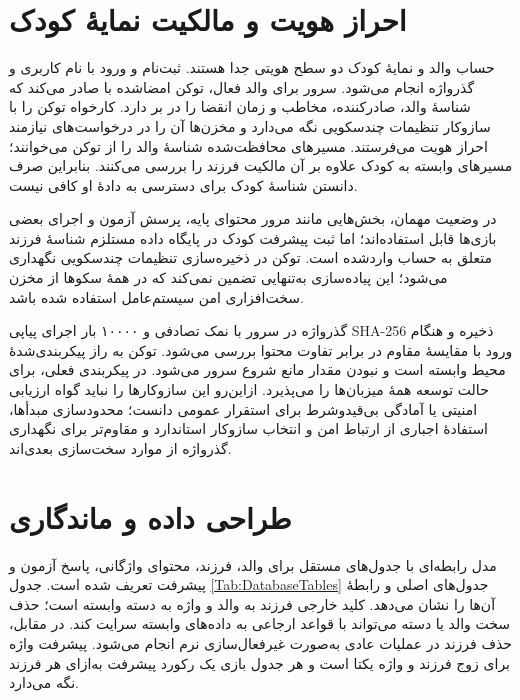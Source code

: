 \section{احراز هویت و مالکیت نمایهٔ کودک}

حساب والد و نمایهٔ کودک دو سطح هویتی جدا هستند. ثبت‌نام و ورود با نام کاربری و گذرواژه انجام می‌شود. سرور برای والد فعال، توکن  امضاشده با  صادر می‌کند که شناسهٔ والد، صادرکننده، مخاطب و زمان انقضا را در بر دارد. کارخواه توکن را با سازوکار تنظیمات چندسکویی نگه می‌دارد و مخزن‌ها آن را در درخواست‌های نیازمند احراز هویت می‌فرستند. مسیرهای محافظت‌شده شناسهٔ والد را از توکن می‌خوانند؛ مسیرهای وابسته به کودک علاوه بر آن مالکیت فرزند را بررسی می‌کنند. بنابراین صرف دانستن شناسهٔ کودک برای دسترسی به دادهٔ او کافی نیست.

در وضعیت مهمان، بخش‌هایی مانند مرور محتوای پایه، پرسش آزمون و اجرای بعضی بازی‌ها قابل استفاده‌اند؛ اما ثبت پیشرفت کودک در پایگاه داده مستلزم شناسهٔ فرزند متعلق به حساب واردشده است. توکن در ذخیره‌سازی تنظیمات چندسکویی نگهداری می‌شود؛ این پیاده‌سازی به‌تنهایی تضمین نمی‌کند که در همهٔ سکوها از مخزن سخت‌افزاری امن سیستم‌عامل استفاده شده باشد.

گذرواژه در سرور با نمک تصادفی و ۱۰۰۰۰ بار اجرای پیاپی SHA-256 ذخیره و هنگام ورود با مقایسهٔ مقاوم در برابر تفاوت محتوا بررسی می‌شود. توکن به راز پیکربندی‌شدهٔ محیط وابسته است و نبودن مقدار  مانع شروع سرور می‌شود. در پیکربندی فعلی،  برای حالت توسعه همهٔ میزبان‌ها را می‌پذیرد. ازاین‌رو این سازوکارها را نباید گواه ارزیابی امنیتی یا آمادگی بی‌قیدوشرط برای استقرار عمومی دانست؛ محدودسازی مبدأها، استفادهٔ اجباری از ارتباط امن و انتخاب سازوکار استاندارد و مقاوم‌تر برای نگهداری گذرواژه از موارد سخت‌سازی بعدی‌اند.

\section{طراحی داده و ماندگاری}

مدل رابطه‌ای با جدول‌های مستقل برای والد، فرزند، محتوای واژگانی، پاسخ آزمون و پیشرفت تعریف شده است. جدول \ref{Tab:DatabaseTables} جدول‌های اصلی و رابطهٔ آن‌ها را نشان می‌دهد. کلید خارجی فرزند به والد و واژه به دسته وابسته است؛ حذف سخت والد یا دسته می‌تواند با قواعد ارجاعی به داده‌های وابسته سرایت کند. در مقابل، حذف فرزند در عملیات عادی به‌صورت غیرفعال‌سازی نرم انجام می‌شود. پیشرفت واژه برای زوج فرزند و واژه یکتا است و هر جدول بازی یک رکورد پیشرفت به‌ازای هر فرزند نگه می‌دارد.

